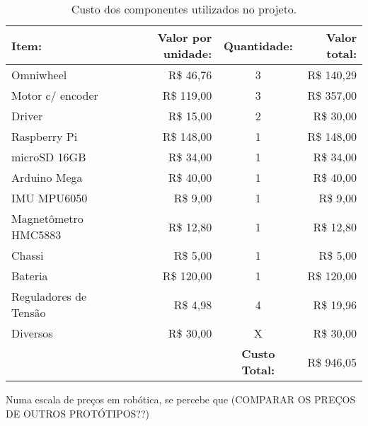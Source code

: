 \begin{table}
  \caption{Custo dos componentes utilizados no projeto.}
  \begin{tabular}{||l r c r||}
     \hline
     \textbf{Item:}   & \textbf{Valor por unidade:} & \textbf{Quantidade:} & \textbf{Valor total:} \\ \hline\hline
     Omniwheel        & R\$ 46,76                   &  3                   & R\$ 140,29            \\ \hline
     Motor c/ encoder & R\$ 119,00                  &  3                   & R\$ 357,00            \\ \hline
     Driver           & R\$ 15,00                   &  2                   & R\$ 30,00             \\ \hline
     Raspberry Pi     & R\$ 148,00                  &  1                   & R\$ 148,00            \\ \hline
     microSD 16GB     & R\$ 34,00                   &  1                   & R\$ 34,00             \\ \hline
     Arduino Mega     & R\$ 40,00                   &  1                   & R\$ 40,00             \\ \hline
     IMU MPU6050      & R\$ 9,00                    &  1                   & R\$ 9,00              \\ \hline
     Magnetômetro HMC5883 & R\$ 12,80               &  1                   & R\$ 12,80             \\ \hline
     Chassi           & R\$ 5,00                    &  1                   & R\$ 5,00              \\ \hline
     Bateria          & R\$ 120,00                  &  1                   & R\$ 120,00            \\ \hline
     Reguladores de Tensão & R\$ 4,98               &  4                   & R\$ 19,96             \\ \hline
     Diversos         & R\$ 30,00                   &  X                   & R\$ 30,00             \\ \hline\hline
                      &                             & \textbf{Custo Total:} & R\$ 946,05           \\ \hline
  \end{tabular}
  \label{tab:custo}
\end{table}

Numa escala de preços em robótica, se percebe que (COMPARAR OS PREÇOS DE OUTROS PROTÓTIPOS??)
